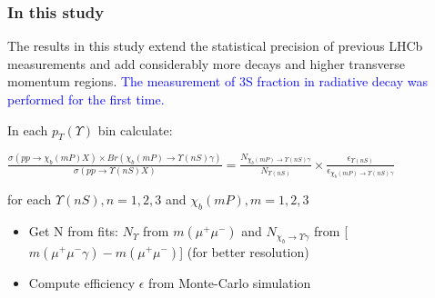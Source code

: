 \begin{frame}
\frametitle{In this study}

The results in this study extend the statistical precision of 
previous LHCb measurements and add considerably more decays and higher transverse
momentum regions.  \textcolor{blue}{The measurement of \Y3S fraction in radiative \chibThreeP
decay was performed for the first time.}
\bigskip

In each $p_T(\Upsilon)$ bin calculate:
\begin{center}
$
\frac{\sigma(pp \to \chi_b (mP) X) \times Br (\chi_b (mP) \to \Upsilon(nS) \gamma)}{\sigma(pp \to \Upsilon(nS) X)} =
\frac{N_{\chi_b (mP)\to \Upsilon(nS) \gamma}}{N_{\Upsilon(nS)}} \times \frac{\epsilon_{\Upsilon(nS)}}{\epsilon_{\chi_b (mP)\to \Upsilon(nS) \gamma}}
$
\end{center}

for each $\Upsilon(nS), n=1,2,3$ and $\chi_b(mP), m=1,2,3$

\begin{itemize}
  \item Get N from fits: $N_{\Upsilon}$ from  $m(\mu^+ \mu^-)$ and $N_{\chi_b \rightarrow \Upsilon \gamma}$ from [$m(\mu^+ \mu^- \gamma) - m(\mu^+ \mu^-)$] (for better resolution)
  \item Compute efficiency $\epsilon$  from Monte-Carlo simulation
\end{itemize}
\end{frame}
